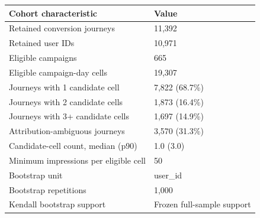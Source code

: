\begin{tabular}{ll}
\toprule
Cohort characteristic & Value \\
\midrule
Retained conversion journeys & 11,392 \\
Retained user IDs & 10,971 \\
Eligible campaigns & 665 \\
Eligible campaign-day cells & 19,307 \\
Journeys with 1 candidate cell & 7,822 (68.7\%) \\
Journeys with 2 candidate cells & 1,873 (16.4\%) \\
Journeys with 3+ candidate cells & 1,697 (14.9\%) \\
Attribution-ambiguous journeys & 3,570 (31.3\%) \\
Candidate-cell count, median (p90) & 1.0 (3.0) \\
Minimum impressions per eligible cell & 50 \\
Bootstrap unit & user\_id \\
Bootstrap repetitions & 1,000 \\
Kendall bootstrap support & Frozen full-sample support \\
\bottomrule
\end{tabular}
